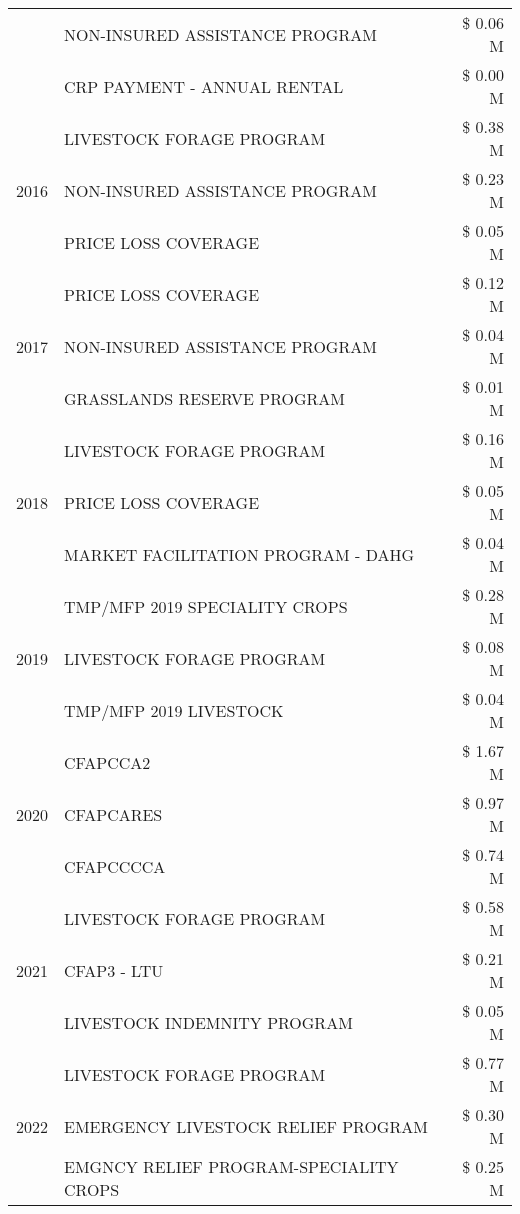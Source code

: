 \begin{tabular}{llr}
 & NON-INSURED ASSISTANCE PROGRAM & \$ 0.06 M \\
 & CRP PAYMENT - ANNUAL RENTAL & \$ 0.00 M \\
\cline{1-3}
\multirow[t]{3}{*}{2016} & LIVESTOCK FORAGE PROGRAM & \$ 0.38 M \\
 & NON-INSURED ASSISTANCE PROGRAM & \$ 0.23 M \\
 & PRICE LOSS COVERAGE & \$ 0.05 M \\
\cline{1-3}
\multirow[t]{3}{*}{2017} & PRICE LOSS COVERAGE & \$ 0.12 M \\
 & NON-INSURED ASSISTANCE PROGRAM & \$ 0.04 M \\
 & GRASSLANDS RESERVE PROGRAM & \$ 0.01 M \\
\cline{1-3}
\multirow[t]{3}{*}{2018} & LIVESTOCK FORAGE PROGRAM & \$ 0.16 M \\
 & PRICE LOSS COVERAGE & \$ 0.05 M \\
 & MARKET FACILITATION PROGRAM - DAHG & \$ 0.04 M \\
\cline{1-3}
\multirow[t]{3}{*}{2019} & TMP/MFP 2019 SPECIALITY CROPS & \$ 0.28 M \\
 & LIVESTOCK FORAGE PROGRAM & \$ 0.08 M \\
 & TMP/MFP 2019 LIVESTOCK & \$ 0.04 M \\
\cline{1-3}
\multirow[t]{3}{*}{2020} & CFAPCCA2 & \$ 1.67 M \\
 & CFAPCARES & \$ 0.97 M \\
 & CFAPCCCCA & \$ 0.74 M \\
\cline{1-3}
\multirow[t]{3}{*}{2021} & LIVESTOCK FORAGE PROGRAM & \$ 0.58 M \\
 & CFAP3 - LTU & \$ 0.21 M \\
 & LIVESTOCK INDEMNITY PROGRAM & \$ 0.05 M \\
\cline{1-3}
\multirow[t]{3}{*}{2022} & LIVESTOCK FORAGE PROGRAM & \$ 0.77 M \\
 & EMERGENCY LIVESTOCK RELIEF PROGRAM & \$ 0.30 M \\
 & EMGNCY RELIEF PROGRAM-SPECIALITY CROPS & \$ 0.25 M \\
\cline{1-3}
\bottomrule
\end{tabular}
